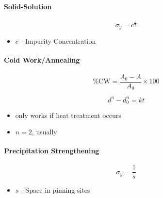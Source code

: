 			\paragraph{Solid-Solution} \label{par:Solid-Solution}
				\begin{equation} \label{eq:Solid-Solution}
					\sigma_{y} = c^{\frac{1}{2}}
				\end{equation}
				\begin{itemize}[noitemsep]
					\item $c$ - Impurity Concentration
				\end{itemize}
			
			\paragraph{Cold Work/Annealing} \label{par:Cold Work/Annealing}
				\begin{equation} \label{eq:Cold Work}
					\text{\%CW} = \frac{A_{0} - A}{A_{0}} \times 100
				\end{equation}
				
				\begin{equation} \label{eq:Cold Work/Annealing}
					d^{n} - d_{0}^{n} = kt
				\end{equation}
				\begin{itemize}[noitemsep]
					\item {} only works if heat treatment occurs
					\item $n=2$, usually
				\end{itemize}
			
			\paragraph{Precipitation Strengthening} \label{par:Precipitate Strengthening}
				\begin{equation} \label{eq:Precipitate Strengthening}
					\sigma_{y} = \frac{1}{s}
				\end{equation}
				\begin{itemize}[noitemsep]
					\item $s$ - Space in pinning sites
				\end{itemize}